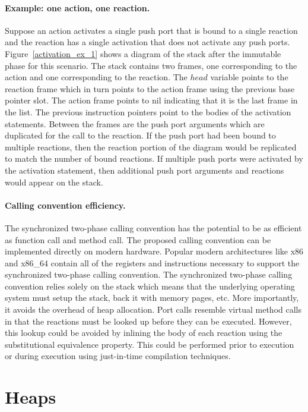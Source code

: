 \paragraph{Example:  one action, one reaction.}
Suppose an action activates a single push port that is bound to a single reaction and the reaction has a single activation that does not activate any push ports.
Figure~\ref{activation_ex_1} shows a diagram of the stack after the immutable phase for this scenario.
The stack contains two frames, one corresponding to the action and one corresponding to the reaction.
The $head$ variable points to the reaction frame which in turn points to the action frame using the previous base pointer slot.
The action frame points to nil indicating that it is the last frame in the list.
The previous instruction pointers point to the bodies of the activation statements.
Between the frames are the push port arguments which are duplicated for the call to the reaction.
If the push port had been bound to multiple reactions, then the reaction portion of the diagram would be replicated to match the number of bound reactions.
If multiple push ports were activated by the activation statement, then additional push port arguments and reactions would appear on the stack.

\paragraph{Calling convention efficiency.}
The synchronized two-phase calling convention has the potential to be as efficient as function call and method call.
The proposed calling convention can be implemented directly on modern hardware.
Popular modern architectures like x86 and x86\_64 contain all of the registers and instructions necessary to support the synchronized two-phase calling convention.
The synchronized two-phase calling convention relies solely on the stack which means that the underlying operating system must setup the stack, back it with memory pages, etc.
More importantly, it avoids the overhead of heap allocation.
Port calls resemble virtual method calls in that the reactions must be looked up before they can be executed.
However, this lookup could be avoided by inlining the body of each reaction using the substitutional equivalence property.
This could be performed prior to execution or during execution using just-in-time compilation techniques.

\section{Heaps}

